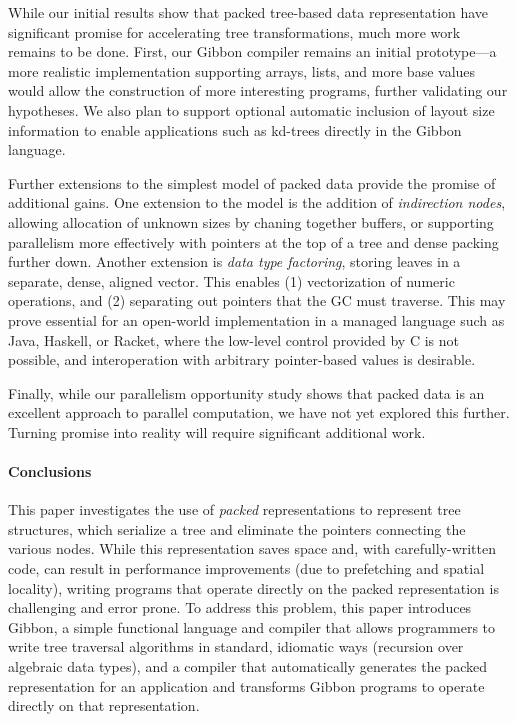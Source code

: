 \documentclass[a4paper,english]{lipics-v2016}
\newcommand{\treelang}{Gibbon\xspace} %
\begin{document}
While our initial results show that packed tree-based data
representation have significant promise for accelerating tree
transformations, much more work remains to be done. First,
our \treelang compiler remains an initial prototype---a more realistic
implementation supporting arrays, lists, and more base values would
allow the construction of more interesting programs, further
validating our hypotheses. We also plan to support optional automatic
inclusion of layout size information to enable applications such as
kd-trees directly in the \treelang language.

Further extensions to the simplest model of packed data provide the
promise of additional gains. One extension to the model is the
addition of \emph{indirection nodes}, allowing allocation of unknown
sizes by chaning together buffers, or supporting parallelism more
effectively with pointers at the top of a tree and dense packing
further down. Another extension is \emph{data type factoring}, storing
leaves in a separate, dense, aligned vector.  This enables (1)
vectorization of numeric operations, and (2) separating out pointers
that the GC must traverse.  This may prove essential for an open-world
implementation in a managed language such as Java, Haskell, or Racket,
where the low-level control provided by C is not possible, and
interoperation with arbitrary pointer-based values is desirable.

Finally, while our parallelism opportunity study shows that packed
data is an excellent approach to parallel computation, we have not yet
explored this further. Turning promise into reality will require
significant additional work.

\paragraph*{Conclusions}

This paper investigates the use of {\em packed} representations to represent
tree structures, which serialize a tree and eliminate the pointers connecting
the various nodes. While this representation saves space and, with
carefully-written code, can result in performance improvements (due to
prefetching and spatial locality), writing programs that operate directly on
the packed representation is challenging and error prone. To address this
problem, this paper introduces \treelang{}, a simple functional language and
compiler that allows programmers to write tree traversal algorithms in
standard, idiomatic ways (recursion over algebraic data types), and a compiler
that automatically generates the packed representation for an application and
transforms \treelang{} programs to operate directly on that representation.
\end{document}
